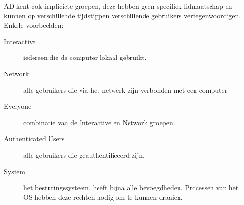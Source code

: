 AD kent ook impliciete groepen, deze hebben geen specifiek lidmaatschap en
kunnen op verschillende tijdstippen verschillende gebruikers vertegenwoordigen.
Enkele voorbeelden:
\begin{description}
	\item[Interactive] iedereen die de computer lokaal gebruikt.
	\item[Network] alle gebruikers die via het netwerk zijn verbonden met
		een computer.
	\item[Everyone] combinatie van de Interactive en Network groepen.
	\item[Authenticated Users] alle gebruikers die geauthentificeerd zijn.
	\item[System] het besturingssysteem, heeft bijna alle bevoegdheden.
		Processen van het OS hebben deze rechten nodig om te kunnen
		draaien.
\end{description}

